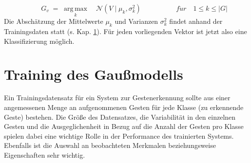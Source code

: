 \begin{equation} \label{finalClassification}
    \qquad \ G_v \; = \; {\underset {k}{\operatorname {arg\,max} }\quad
    \mathcal {N}(V\mid \mu_k ,\sigma^{2}_k)}\qquad \qquad \ \ \ \ \
    f\ddot{u}r\quad 1\leq k\leq |G|
\end{equation}
Die Abschätzung der Mittelwerte $\mu_k$ und Varianzen $\sigma_k^2$ findet anhand der Trainingsdaten statt (s. Kap. \ref{Training}). Für jeden vorliegenden Vektor ist jetzt also eine Klassifizierung möglich. 

\section{Training des Gaußmodells} \label{Training}
Ein Trainingsdatensatz für ein System zur Gestenerkennung sollte aus einer angemessenen Menge an aufgenommenen Gesten für jede Klasse (zu erkennende Geste) bestehen. Die Größe des Datensatzes, die Variabilität in den einzelnen Gesten und die Ausgeglichenheit in Bezug auf die Anzahl der Gesten pro Klasse spielen dabei eine wichtige Rolle in der Performance des trainierten Systems. Ebenfalls ist die Auswahl an beobachteten Merkmalen beziehungsweise Eigenschaften sehr wichtig.~\cite{sampleSize}

